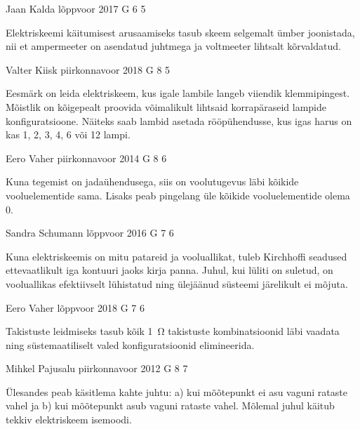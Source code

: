 \documentclass[11pt, twoside]{article}
\begin{document}
{%
{Jaan Kalda} %
{lõppvoor} %
{2017} %
{G 6} %
{5} %
{

\ifHint
Elektriskeemi käitumisest arusaamiseks tasub skeem selgemalt ümber joonistada, nii et ampermeeter on asendatud juhtmega ja voltmeeter lihtsalt kõrvaldatud.
\fi
}

{Valter Kiisk} %
{piirkonnavoor} %
{2018} %
{G 8} %
{5} %
{

\ifHint
Eesmärk on leida elektriskeem, kus igale lambile langeb viiendik klemmipingest. Mõistlik on kõigepealt proovida võimalikult lihtsaid korrapäraseid lampide konfiguratsioone. Näiteks saab lambid asetada rööpühendusse, kus igas harus on kas 1, 2, 3, 4, 6 või 12 lampi.
\fi
}

{Eero Vaher} %
{piirkonnavoor} %
{2014} %
{G 8} %
{6} %
{

\ifHint
Kuna tegemist on jadaühendusega, siis on voolutugevus läbi kõikide vooluelementide sama. Lisaks peab pingelang üle kõikide vooluelementide olema \num{0}.
\fi
}

{Sandra Schumann} %
{lõppvoor} %
{2016} %
{G 7} %
{6} %
{

\ifHint
Kuna elektriskeemis on mitu patareid ja vooluallikat, tuleb Kirchhoffi seadused ettevaatlikult iga kontuuri jaoks kirja panna. Juhul, kui lüliti on suletud, on vooluallikas efektiivselt lühistatud ning ülejäänud süsteemi järelikult ei mõjuta.
\fi
}

{Eero Vaher} %
{lõppvoor} %
{2018} %
{G 7} %
{6} %
{

\ifHint
Takistuste leidmiseks tasub kõik \SI{1}{\ohm} takistuste kombinatsioonid läbi vaadata ning süstemaatiliselt valed konfiguratsioonid elimineerida.
\fi
}

{Mihkel Pajusalu} %
{piirkonnavoor} %
{2012} %
{G 8} %
{7} %
{

\ifHint
Ülesandes peab käsitlema kahte juhtu: a) kui mõõtepunkt ei asu vaguni rataste vahel ja b) kui mõõtepunkt asub vaguni rataste vahel. Mõlemal juhul käitub tekkiv elektriskeem isemoodi.
\fi
}

}
\end{document}
